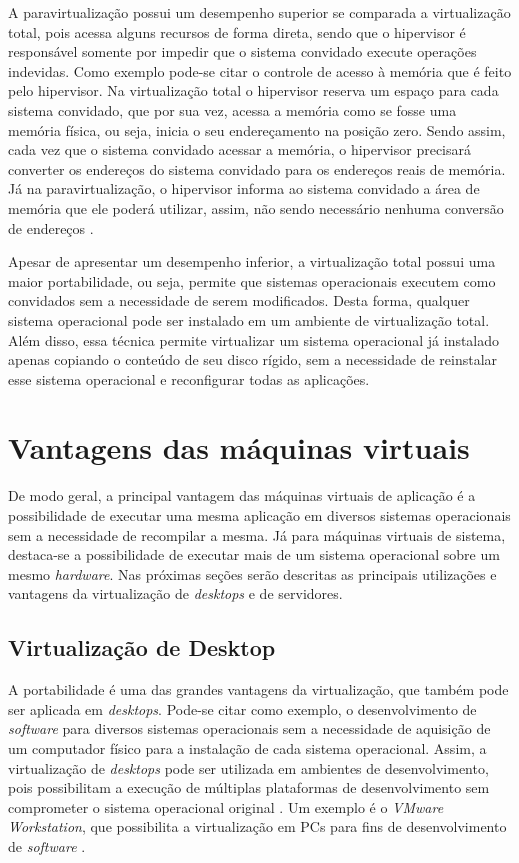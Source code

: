 A paravirtualização possui um desempenho superior se comparada a virtualização total, pois acessa alguns recursos de forma direta, sendo que 
o hipervisor é responsável somente por impedir que o sistema convidado execute operações indevidas. Como exemplo pode-se citar o controle de
acesso à memória que é feito pelo hipervisor. Na virtualização total o hipervisor reserva um espaço para cada sistema convidado, que por sua vez, 
acessa a memória como se fosse uma memória física, ou seja, inicia o seu endereçamento na posição zero. Sendo assim, cada vez que o sistema 
convidado acessar a memória, o hipervisor precisará converter os endereços do sistema convidado para os endereços reais de memória. Já na 
paravirtualização, o hipervisor informa ao sistema convidado a área de memória que ele poderá utilizar, assim, não sendo necessário nenhuma 
conversão de endereços \cite{maziero2013}.

Apesar de apresentar um desempenho inferior, a virtualização total possui uma maior portabilidade, ou seja, permite que sistemas operacionais 
executem como convidados sem a necessidade de serem modificados. Desta forma, qualquer sistema operacional pode ser instalado em um ambiente 
de virtualização total. Além disso, essa técnica permite virtualizar um sistema operacional já instalado apenas copiando o conteúdo de seu disco 
rígido, sem a necessidade de reinstalar esse sistema operacional e reconfigurar todas as aplicações.

\section{Vantagens das máquinas virtuais}
\label{section:virtvantag}

De modo geral, a principal vantagem das máquinas virtuais de aplicação é a possibilidade de executar uma mesma aplicação em diversos sistemas 
operacionais sem a necessidade de recompilar a mesma. Já para máquinas virtuais de sistema, destaca-se a possibilidade de executar mais de um 
sistema operacional sobre um mesmo \textit{hardware}. Nas próximas seções serão descritas as principais utilizações e vantagens da virtualização 
de \textit{desktops} e de servidores.

\subsection{Virtualização de Desktop}
\label{section:virtdesk}

A portabilidade é uma das grandes vantagens da virtualização, que também pode ser aplicada em \textit{desktops}. Pode-se citar como exemplo, 
o desenvolvimento de \textit{software} para diversos sistemas operacionais sem a necessidade de aquisição de um computador físico para a instalação
de cada sistema operacional. Assim, a virtualização de \textit{desktops} pode ser utilizada em ambientes de desenvolvimento, pois possibilitam 
a execução de múltiplas plataformas de desenvolvimento sem comprometer o sistema operacional original \cite{carissimi2008}. Um exemplo é o 
\textit{VMware Workstation}, que possibilita a virtualização em \acp{PC} para fins de desenvolvimento de \textit{software} \cite{vmware2016}.

